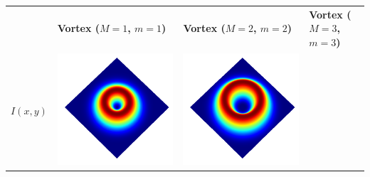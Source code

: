 \documentclass[a4paper, 12pt]{article}
\begin{document}
\begin{center}
\begin{tabular}{M{1cm}M{5cm}M{5cm}M{5cm}}
\ & \textbf{Vortex ($M=1$, $m=1$)} & \textbf{Vortex ($M=2$, $m=2$)} & \textbf{Vortex ($M=3$, $m=3$)} \\
$I(x,y)$ &
\includegraphics[width=\linewidth]{../resources/intensity_M=1.png} & 
\includegraphics[width=\linewidth]{../resources/intensity_M=2.png} & 

\end{tabular}
\end{center}
\end{document}
